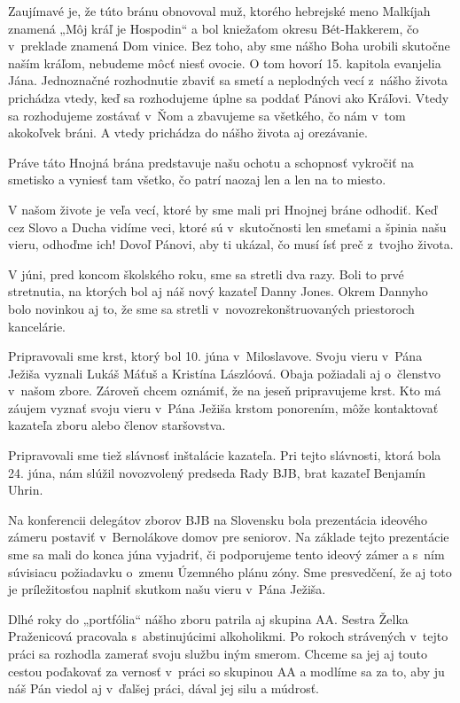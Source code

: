 Zaujímavé je, že túto bránu obnovoval muž, ktorého hebrejské meno Malkíjah znamená „Môj kráľ je Hospodin“ a bol kniežaťom okresu Bét-Hakkerem, čo v~preklade znamená Dom vinice. Bez toho, aby sme nášho Boha urobili skutočne naším kráľom, nebudeme môcť niesť ovocie. O tom hovorí 15. kapitola evanjelia Jána. Jednoznačné rozhodnutie zbaviť sa smetí a neplodných vecí z~nášho života prichádza vtedy, keď sa rozhodujeme úplne sa poddať Pánovi ako Kráľovi. Vtedy sa rozhodujeme zostávať v~Ňom a zbavujeme sa všetkého, čo nám v~tom akokoľvek bráni. A vtedy prichádza do nášho života aj orezávanie.

Práve táto Hnojná brána predstavuje našu ochotu a schopnosť vykročiť na smetisko a vyniesť tam všetko, čo patrí naozaj len a len na to miesto.

V našom živote je veľa vecí, ktoré by sme mali pri Hnojnej bráne odhodiť. Keď cez Slovo a Ducha vidíme veci, ktoré sú v~skutočnosti len smeťami a špinia našu vieru, odhoďme ich! Dovoľ Pánovi, aby ti ukázal, čo musí ísť preč z~tvojho života.



V júni, pred koncom školského roku, sme sa stretli dva razy. Boli to prvé stretnutia, na ktorých bol aj náš nový kazateľ Danny Jones. Okrem Dannyho bolo novinkou aj to, že sme sa stretli v~novozrekonštruovaných priestoroch kancelárie.

Pripravovali sme krst, ktorý bol 10. júna v~Miloslavove. Svoju vieru v~Pána Ježiša vyznali Lukáš Máťuš a Kristína Lászlóová. Obaja požiadali aj o~členstvo v~našom zbore. Zároveň chcem oznámiť, že na jeseň pripravujeme krst. Kto má záujem vyznať svoju vieru v~Pána Ježiša krstom ponorením, môže kontaktovať kazateľa zboru alebo členov staršovstva.

Pripravovali sme tiež slávnosť inštalácie kazateľa. Pri tejto slávnosti, ktorá bola 24. júna, nám slúžil novozvolený predseda Rady BJB, brat kazateľ Benjamín Uhrin.

Na konferencii delegátov zborov BJB na Slovensku bola prezentácia ideového zámeru postaviť v~Bernolákove domov pre seniorov. Na základe tejto prezentácie sme sa mali do konca júna vyjadriť, či podporujeme tento ideový zámer a s~ním súvisiacu požiadavku o~zmenu Územného plánu zóny. Sme presvedčení, že aj toto je príležitosťou naplniť skutkom našu vieru v~Pána Ježiša.

Dlhé roky do „portfólia“ nášho zboru patrila aj skupina AA. Sestra Želka Praženicová pracovala s~abstinujúcimi alkoholikmi. Po rokoch strávených v~tejto práci sa rozhodla zamerať svoju službu iným smerom. Chceme sa jej aj touto cestou poďakovať za vernosť v~práci so skupinou AA a modlíme sa za to, aby ju náš Pán viedol aj v~ďalšej práci, dával jej silu a múdrosť.

